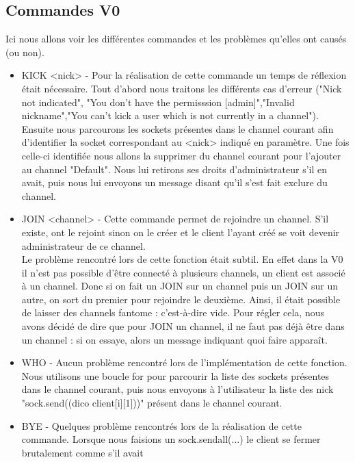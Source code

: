 \documentclass[12pt]{article}
\begin{document}
\subsection{Commandes V0}
Ici nous allons voir les différentes commandes et les problèmes qu'elles ont causés (ou non).\\
\begin{itemize}
    \item KICK <nick> - Pour la réalisation de cette commande un temps de réflexion était nécessaire. Tout d'abord nous traitons les différents cas d'erreur ("Nick not indicated", "You don't have the permisssion [admin]","Invalid nickname","You can't kick a user 
    which is not currently in a channel"). Ensuite nous parcourons les sockets présentes dans le channel courant afin d'identifier la socket correspondant au <nick> indiqué en paramètre. Une fois celle-ci identifiée nous allons la supprimer du channel
    courant pour l'ajouter au channel "Default". Nous lui retirons ses droits d'administrateur s'il en avait, puis nous lui envoyons un message disant qu'il s'est fait exclure du channel.\\
    \item JOIN <channel> - Cette commande permet de rejoindre un channel. S'il existe, ont le rejoint sinon on le créer et le client l'ayant créé se voit devenir administrateur de ce channel.\\
    Le problème rencontré lors de cette fonction était subtil. En effet dans la V0 il n'est pas possible d'être connecté à plusieurs channels, un client est associé à un channel. Donc si on fait un JOIN sur un channel
    puis un JOIN sur un autre, on sort du premier pour rejoindre le deuxième. Ainsi, il était possible de laisser des channels fantome : c'est-à-dire vide. Pour régler cela, nous avons décidé de dire que pour JOIN un channel,
    il ne faut pas déjà être dans un channel : si on essaye, alors un message indiquant quoi faire apparaît. \\
    \item WHO - Aucun problème rencontré lors de l'implémentation de cette fonction. Nous utilisons une boucle for pour parcourir la liste des sockets présentes dans le channel courant, puis nous envoyons à l'utilisateur la liste des nick "sock.send((dico client[i][1]))" 
    présent dans le channel courant.\\
    \item BYE - Quelques problème rencontrés lors de la réalisation de cette commande. Lorsque nous faisions un sock.sendall(...) le client se fermer brutalement comme s'il avait 

\end{itemize}
\end{document}
